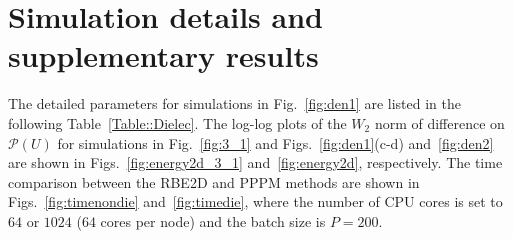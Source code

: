 
\section{Simulation details and supplementary results}
The detailed parameters for simulations in Fig.~\ref{fig:den1} are listed in the following Table~\ref{Table::Dielec}.  {The log-log plots of the $W_2$ norm of difference on $\mathscr{P}(U)$ for simulations in Fig.~\ref{fig:3_1} and Figs.~\ref{fig:den1}(c-d) and~\ref{fig:den2} are shown in Figs.~\ref{fig:energy2d_3_1} and~\ref{fig:energy2d}, respectively.}
 {The time comparison between the RBE2D and PPPM methods are shown in Figs.~\ref{fig:timenondie} and~\ref{fig:timedie}, where the number of CPU cores is set to $64$ or $1024$ ($64$ cores per node) and the batch size is $P=200$.}

